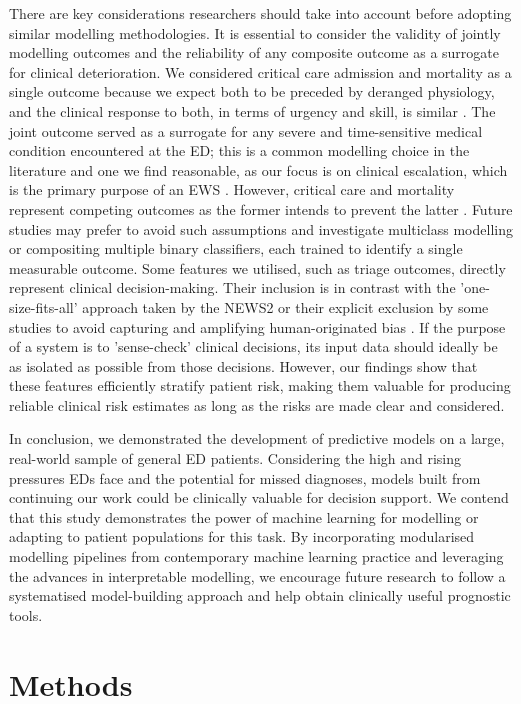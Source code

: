 \documentclass[fleqn,10pt]{wlscirep}
\begin{document}
There are key considerations researchers should take into account before adopting similar modelling methodologies. It is essential to consider the validity of jointly modelling outcomes and the reliability of any composite outcome as a surrogate for clinical deterioration. We considered critical care admission and mortality as a single outcome because we expect both to be preceded by deranged physiology, and the clinical response to both, in terms of urgency and skill, is similar \cite{Smith13}. The joint outcome served as a surrogate for any severe and time-sensitive medical condition encountered at the ED; this is a common modelling choice in the literature \cite{Gerry20, Levin18} and one we find reasonable, as our focus is on clinical escalation, which is the primary purpose of an EWS \cite{Morgan07}. However, critical care and mortality represent competing outcomes as the former intends to prevent the latter \cite{Wolbers09}. Future studies may prefer to avoid such assumptions and investigate multiclass modelling or compositing multiple binary classifiers, each trained to identify a single measurable outcome. Some features we utilised, such as triage outcomes, directly represent clinical decision-making. Their inclusion is in contrast with the 'one-size-fits-all' approach taken by the NEWS2 \cite{Inada18} or their explicit exclusion by some studies to avoid capturing and amplifying human-originated bias \cite{Meyer18}. If the purpose of a system is to 'sense-check' clinical decisions, its input data should ideally be as isolated as possible from those decisions. However, our findings show that these features efficiently stratify patient risk, making them valuable for producing reliable clinical risk estimates as long as the risks are made clear and considered.

In conclusion, we demonstrated the development of predictive models on a large, real-world sample of general ED patients. Considering the high and rising pressures EDs face and the potential for missed diagnoses, models built from continuing our work could be clinically valuable for decision support. We contend that this study demonstrates the power of machine learning for modelling or adapting to patient populations for this task. By incorporating modularised modelling pipelines from contemporary machine learning practice and leveraging the advances in interpretable modelling, we encourage future research to follow a systematised model-building approach and help obtain clinically useful prognostic tools.

\section*{Methods}
\end{document}
